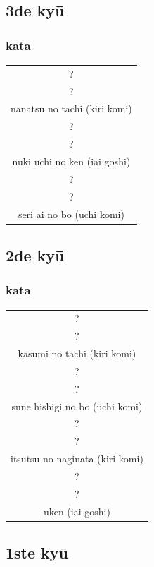 \documentclass[a4paper, 12pt]{article}
\begin{document}
\begin{CJK*}{UTF8}{min}
\subsection{3de ky\={u}}
\subsubsection{kata}
\begin{table}[H]
\begin{center}
\begin{tabular}{c}
?\\
?\\
nanatsu no tachi (kiri komi)\\
\hline
?\\
?\\
nuki uchi no ken (iai goshi)\\
\hline
?\\
?\\
seri ai no bo (uchi komi)
\end{tabular}
\end{center}
\label{kyuu_3_katori_kata}
\end{table}

\subsection{2de ky\={u}}
\subsubsection{kata}
\begin{table}[H]
\begin{center}
\begin{tabular}{c}
?\\
?\\
kasumi no tachi (kiri komi)\\
\hline
?\\
?\\
sune hishigi no bo (uchi komi)\\
\hline
?\\
?\\
itsutsu no naginata (kiri komi)\\
\hline
?\\
?\\
uken (iai goshi)
\end{tabular}
\end{center}
\label{kyuu_2_katori_kata}
\end{table}

\subsection{1ste ky\={u}}

\end{CJK*}
\end{document}
